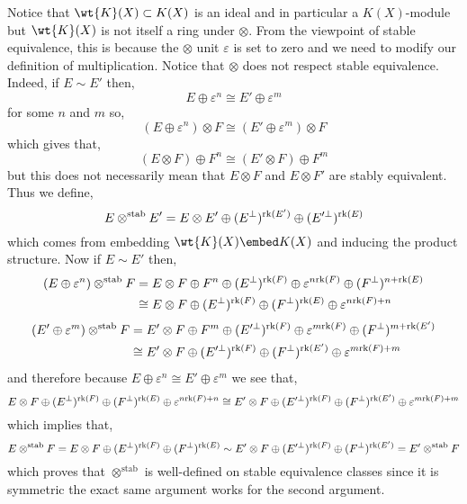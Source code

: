 \documentclass[12pt]{extarticle}
\begin{document}
\begin{rmk}
Notice that $\wt{K}(X) \subset K(X)$ is an ideal and in particular a $K(X)$-module but $\wt{K}(X)$ is not itself a ring under $\otimes$. From the viewpoint of stable equivalence, this is because the $\otimes$ unit $\varepsilon$ is set to zero and we need to modify our definition of multiplication. Notice that $\otimes$ does not respect stable equivalence. Indeed, if $E \sim E'$ then,
\[ E \oplus \varepsilon^n \cong E' \oplus \varepsilon^m \]
for some $n$ and $m$ so,
\[ (E \oplus \varepsilon^n) \otimes F \cong (E' \oplus \varepsilon^m) \otimes F \]
which gives that,
\[ (E \otimes F) \oplus F^n \cong (E' \otimes F) \oplus F^m \]
but this does not necessarily mean that $E \otimes F$ and $E \otimes F'$ are stably equivalent. Thus we define,
\[ E \otimes^{\mathrm{stab}} E' = E \otimes E' \oplus (E^\perp)^{\mathrm{rk}(E')} \oplus (E'^\perp)^{\mathrm{rk}(E)} \]
which comes from embedding $\wt{K}(X) \embed K(X)$ and inducing the product structure. Now if $E \sim E'$ then,
\begin{align*}
(E \oplus \varepsilon^n) \otimes^{\text{stab}} F & = E \otimes F \oplus F^n \oplus (E^\perp)^{\mathrm{rk}(F)} \oplus \varepsilon^{n \mathrm{rk}(F)} \oplus (F^\perp)^{n + \mathrm{rk}(E)}
\\
& \cong E \otimes F \oplus (E^\perp)^{\mathrm{rk}(F)} \oplus (F^\perp)^{\mathrm{rk}(E)} \oplus \varepsilon^{n \mathrm{rk}(F) + n}
\end{align*}
\begin{align*}
(E' \oplus \varepsilon^m) \otimes^{\text{stab}} F & = E' \otimes F \oplus F^m \oplus (E'^\perp)^{\mathrm{rk}(F)} \oplus \varepsilon^{m \mathrm{rk}(F)} \oplus (F^\perp)^{m + \mathrm{rk}(E')}
\\
& \cong E' \otimes F \oplus (E'^\perp)^{\mathrm{rk}(F)} \oplus (F^\perp)^{\mathrm{rk}(E')} \oplus \varepsilon^{m \mathrm{rk}(F) + m}
\end{align*}
and therefore because $E \oplus \varepsilon^n \cong E' \oplus \varepsilon^m$ we see that,
\[ E \otimes F \oplus (E^\perp)^{\mathrm{rk}(F)} \oplus (F^\perp)^{\mathrm{rk}(E)} \oplus \varepsilon^{n \mathrm{rk}(F) + n} \cong E' \otimes F \oplus (E'^\perp)^{\mathrm{rk}(F)} \oplus (F^\perp)^{\mathrm{rk}(E')} \oplus \varepsilon^{m \mathrm{rk}(F) + m} \]
which implies that,
\[ E \otimes^{\text{stab}} F = E \otimes F \oplus (E^\perp)^{\mathrm{rk}(F)} \oplus (F^\perp)^{\mathrm{rk}(E)} \sim E' \otimes F \oplus (E'^\perp)^{\mathrm{rk}(F)} \oplus (F^\perp)^{\mathrm{rk}(E')} = E' \otimes^{\text{stab}} F \]
which proves that $\otimes^{\text{stab}}$ is well-defined on stable equivalence classes since it is symmetric the exact same argument works for the second argument. 
\end{rmk}
\end{document}
